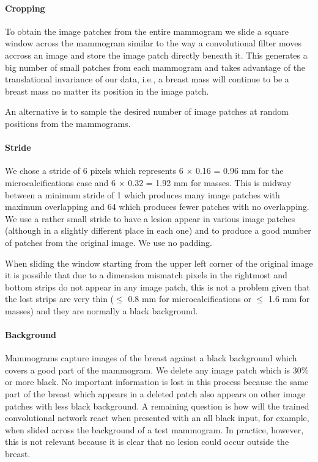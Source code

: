 \paragraph{Cropping}
To obtain the image patches from the entire mammogram we slide a square window across the mammogram similar to the way a convolutional filter moves accross an image and store the image patch directly beneath it. This generates a big number of small patches from each mammogram and takes advantage of the translational invariance of our data, i.e., a breast mass will continue to be a breast mass no matter its position in the image patch.

An alternative is to sample the desired number of image patches at random positions from the mammograms.

\paragraph{Stride}
We chose a stride of 6 pixels which represents 6 $\times$ 0.16 = 0.96 mm for the microcalcifications case and 6 $\times$ 0.32 = 1.92 mm for masses. This is midway between a minimum stride of 1 which produces many image patches with maximum overlapping and 64 which produces fewer patches with no overlapping. We use a rather small stride to have a lesion appear in various image patches (although in a slightly different place in each one) and to produce a good number of patches from the original image. We use no padding.

When sliding the window starting from the upper left corner of the original image it is possible that due to a dimension mismatch pixels in the rightmost and bottom strips do not appear in any image patch, this is not a problem given that the lost strips are very thin ($\leq$ 0.8 mm for microcalcifications or  $\leq$ 1.6 mm for masses) and they are normally a black background.

\paragraph{Background}
Mammograms capture images of the breast against a black background which covers a good part of the mammogram. We delete any image patch which is 30\% or more black. No important information is lost in this process because the same part of the breast which appears in a deleted patch also appears on other image patches with less black background. A remaining question is how will the trained convolutional network react when presented with an all black input, for example, when slided across the background of a test mammogram. In practice, however, this is not relevant because it is clear that no lesion could occur outside the breast. 

